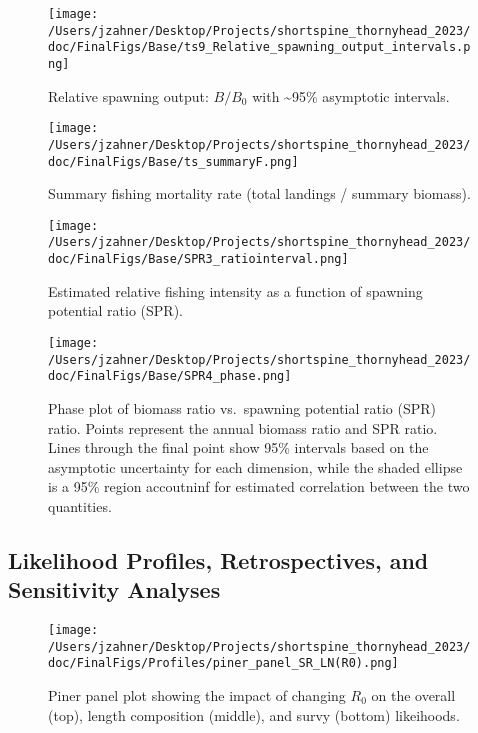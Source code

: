 \documentclass[11pt,
  english,
  letterpaper,
]{article}
\begin{document}
\begin{figure}
\centering
\texttt{[image: /Users/jzahner/Desktop/Projects/shortspine\_thornyhead\_2023/doc/FinalFigs/Base/ts9\_Relative\_spawning\_output\_intervals.png]}
\caption{Relative spawning output: \(B/B_0\) with \textasciitilde95\% asymptotic intervals.\label{fig:relspawnout}}
\end{figure}

\begin{figure}
\centering
\texttt{[image: /Users/jzahner/Desktop/Projects/shortspine\_thornyhead\_2023/doc/FinalFigs/Base/ts\_summaryF.png]}
\caption{Summary fishing mortality rate (total landings / summary biomass).\label{fig:summary_f}}
\end{figure}

\begin{figure}
\centering
\texttt{[image: /Users/jzahner/Desktop/Projects/shortspine\_thornyhead\_2023/doc/FinalFigs/Base/SPR3\_ratiointerval.png]}
\caption{Estimated relative fishing intensity as a function of spawning potential ratio (SPR).\label{fig:spr_trajectory}}
\end{figure}

\begin{figure}
\centering
\texttt{[image: /Users/jzahner/Desktop/Projects/shortspine\_thornyhead\_2023/doc/FinalFigs/Base/SPR4\_phase.png]}
\caption{Phase plot of biomass ratio vs.~spawning potential ratio (SPR) ratio. Points represent the annual biomass ratio and SPR ratio. Lines through the final point show 95\% intervals based on the asymptotic uncertainty for each dimension, while the shaded ellipse is a 95\% region accoutninf for estimated correlation between the two quantities.\label{fig:phase_diagram}}
\end{figure}

\clearpage

\hypertarget{likelihood-profiles-retrospectives-and-sensitivity-analyses}{%
\subsection{Likelihood Profiles, Retrospectives, and Sensitivity Analyses}\label{likelihood-profiles-retrospectives-and-sensitivity-analyses}}

\begin{figure}
\centering
\texttt{[image: /Users/jzahner/Desktop/Projects/shortspine\_thornyhead\_2023/doc/FinalFigs/Profiles/piner\_panel\_SR\_LN(R0).png]}
\caption{Piner panel plot showing the impact of changing \(R_0\) on the overall (top), length composition (middle), and survy (bottom) likeihoods.\label{fig:R0_prof}}
\end{figure}
\end{document}
